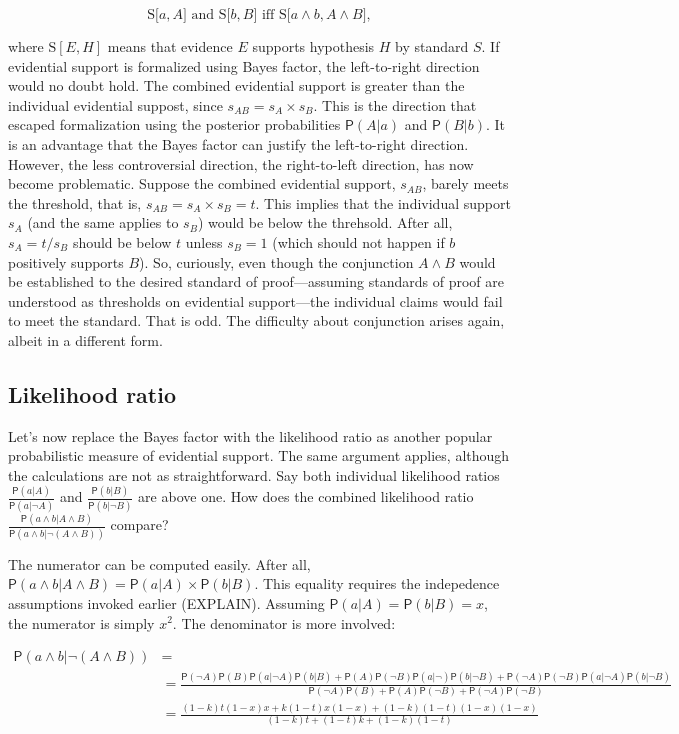 \documentclass[10pt,dvipsnames,enabledeprecatedfontcommands]{scrartcl}
\newcommand{\et}{\wedge}
\newcommand{\pr}[1]{\mathsf{P}(#1)}
\begin{document}
\[\text{S[$a, A$] and S[$b, B$] iff S[$a \wedge b, A\wedge B$]},\]

\noindent where \(\text{S}[E, H]\) means that evidence \(E\) supports
hypothesis \(H\) by standard \(S\). If evidential support is formalized
using Bayes factor, the left-to-right direction would no doubt hold. The
combined evidential support is greater than the individual evidential
suppost, since \(s_{AB} = s_{A}\times s_{B}\). This is the direction
that escaped formalization using the posterior probabilities
\(\pr{A | a}\) and \(\pr{B | b}\). It is an advantage that the Bayes
factor can justify the left-to-right direction. However, the less
controversial direction, the right-to-left direction, has now become
problematic. Suppose the combined evidential support, \(s_{AB}\), barely
meets the threshold, that is, \(s_{AB}=s_{A}\times s_{B}=t\). This
implies that the individual support \(s_{A}\) (and the same applies to
\(s_{B}\)) would be below the threhsold. After all, \(s_{A} = t/ s_{B}\)
should be below \(t\) unless \(s_{B}=1\) (which should not happen if
\(b\) positively supports \(B\)). So, curiously, even though the
conjunction \(A\et B\) would be established to the desired standard of
proof---assuming standards of proof are understood as thresholds on
evidential support---the individual claims would fail to meet the
standard. That is odd. The difficulty about conjunction arises again,
albeit in a different form.

\hypertarget{likelihood-ratio}{%
\subsection{Likelihood ratio}\label{likelihood-ratio}}

Let's now replace the Bayes factor with the likelihood ratio as another
popular probabilistic measure of evidential support. The same argument
applies, although the calculations are not as straightforward. Say both
individual likelihood ratios \(\frac{\pr{a |A}}{\pr{a | \neg A}}\) and
\(\frac{\pr{b |B}}{\pr{b | \neg B}}\) are above one. How does the
combined likelihood ratio
\(\frac{\pr{ a \et b |A \et B}}{\pr{a \et b | \neg (A \et B)}}\)
compare?

The numerator can be computed easily. After all,
\(\pr{ a \et b |A \et B}=\pr{ a|A}\times \pr{ b |B}\). This equality
requires the indepedence assumptions invoked earlier (EXPLAIN). Assuming
\(\pr{a |A}=\pr{b |B}=x\), the numerator is simply \(x^2\). The
denominator is more involved:

\begin{align*}
\pr{a \et b| \neg (A\et B)} & =  \\
& = \frac{\pr{\neg A}\pr{B} \pr{a | \neg A}\pr{b | B} + \pr{A}\pr{\neg B} \pr{a | \neg}\pr{b | \neg B} + \pr{\neg A}\pr{\neg B} \pr{a | \neg A}\pr{b | \neg B}}{\pr{\neg A}\pr{B} + \pr{A}\pr{\neg B} + \pr{\neg A}\pr{\neg B} }  \\ 
& = \frac{(1-k)t(1-x)x + k(1-t)x(1-x) + (1-k)(1-t)(1-x)(1-x)}{ \left(1-k\right) t +\left(1-t\right) k+\left(1-k\right) \left(1-t\right) }
 \end{align*}
\end{document}
